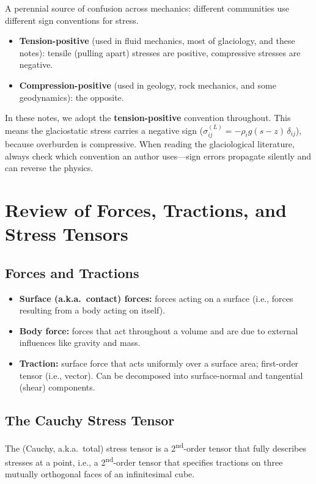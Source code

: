 \documentclass[11pt]{article}
\begin{document}
A perennial source of confusion across mechanics: different communities use different sign conventions for stress.
\begin{itemize}
  \item \textbf{Tension-positive} (used in fluid mechanics, most of glaciology, and these notes): tensile (pulling apart) stresses are positive, compressive stresses are negative.
  \item \textbf{Compression-positive} (used in geology, rock mechanics, and some geodynamics): the opposite.
\end{itemize}
In these notes, we adopt the \textbf{tension-positive} convention throughout.  This means the glaciostatic stress carries a negative sign ($\sigma_{ij}^{(L)} = -\rho_i g(s-z)\,\delta_{ij}$), because overburden is compressive.  When reading the glaciological literature, always check which convention an author uses---sign errors propagate silently and can reverse the physics.

\section{Review of Forces, Tractions, and Stress Tensors}

\subsection{Forces and Tractions}
\begin{itemize}
  \item \textbf{Surface (a.k.a.\ contact) forces:} forces acting on a surface (i.e., forces resulting from a body acting on itself).
  \item \textbf{Body force:} forces that act throughout a volume and are due to external influences like gravity and mass.
  \item \textbf{Traction:} surface force that acts uniformly over a surface area; first-order tensor (i.e., vector).
        Can be decomposed into surface-normal and tangential (shear) components.
\end{itemize}

\subsection{The Cauchy Stress Tensor}
The (Cauchy, a.k.a.\ total) stress tensor is a 2\textsuperscript{nd}-order tensor that fully describes stresses at a point, i.e., a 2\textsuperscript{nd}-order tensor that specifies tractions on three mutually orthogonal faces of an infinitesimal cube.
\end{document}
